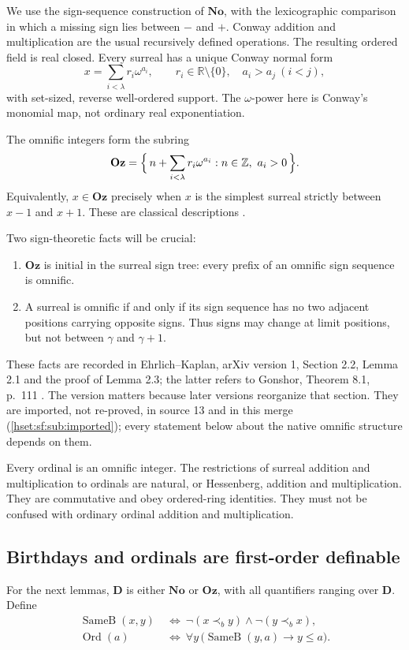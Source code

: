 \documentclass[11pt,letterpaper]{article}
\theoremstyle{definition}
\theoremstyle{remark}
\newcommand{\No}{\mathbf{No}}
\newcommand{\Ord}{\operatorname{Ord}}
\newcommand{\Oz}{\mathbf{Oz}}
\newcommand{\R}{\mathbb R}
\newcommand{\Z}{\mathbb Z}
\newcommand{\precb}{\prec_b}
\newcommand{\EqB}{\operatorname{SameB}}
\newcommand{\Dd}{\mathbf{D}}
\begin{document}
We use the sign-sequence construction of $\No$, with the lexicographic comparison
in which a missing sign lies between $-$ and $+$. Conway addition and
multiplication are the usual recursively defined operations. The resulting ordered
field is real closed. Every surreal has a unique Conway normal form
\[
 x=\sum_{i<\lambda}r_i\omega^{a_i},
 \qquad r_i\in\R\setminus\{0\},\quad a_i>a_j\ (i<j),
\]
with set-sized, reverse well-ordered support. The $\omega$-power here is Conway's
monomial map, not ordinary real exponentiation.

The omnific integers form the subring
\[
 \Oz=\Bigl\{\,n+\sum_{i<\lambda}r_i\omega^{a_i}:n\in\Z,\ a_i>0\,\Bigr\}.
\]
Equivalently, $x\in\Oz$ precisely when $x$ is the simplest surreal strictly
between $x-1$ and $x+1$. These are classical descriptions
\cite{Conway,Gonshor,EhrlichKaplanII}.

Two sign-theoretic facts will be crucial:
\begin{enumerate}[label=(\roman*)]
\item\label{hset:sf:item:initial} $\Oz$ is initial in the surreal sign tree: every
prefix of an omnific sign sequence is omnific.
\item\label{hset:sf:item:signcrit} A surreal is omnific if and only if its sign
sequence has no two adjacent positions carrying opposite signs. Thus signs may
change at limit positions, but not between $\gamma$ and $\gamma+1$.
\end{enumerate}
These facts are recorded in Ehrlich--Kaplan, arXiv version 1, Section 2.2,
Lemma 2.1 and the proof of Lemma 2.3; the latter refers to Gonshor, Theorem 8.1,
p.~111 \cite{EhrlichKaplan,Gonshor}. The version matters because later versions
reorganize that section. They are imported, not re-proved, in source 13 and in
this merge (\cref{hset:sf:sub:imported}); every statement below about the native
omnific structure depends on them.

Every ordinal is an omnific integer. The restrictions of surreal addition and
multiplication to ordinals are natural, or Hessenberg, addition and
multiplication. They are commutative and obey ordered-ring identities. They must
not be confused with ordinary ordinal addition and multiplication.

\subsection{Birthdays and ordinals are first-order definable}

For the next lemmas, $\Dd$ is either $\No$ or $\Oz$, with all quantifiers ranging
over $\Dd$. Define
\begin{align}
 \EqB(x,y)&\ \Longleftrightarrow\ \neg(x\precb y)\land\neg(y\precb x),\label{hset:sf:eq:sameb}\\
 \Ord(a)&\ \Longleftrightarrow\ \forall y\,\bigl(\EqB(y,a)\longrightarrow y\le a\bigr).
 \label{hset:sf:eq:ord}
\end{align}
\end{document}
